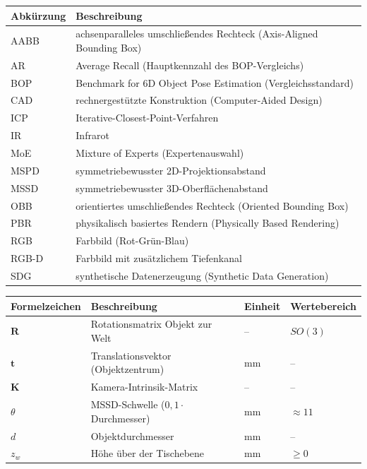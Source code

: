 \documentclass[oneside,studentpaper]{wbk}
\renewcommand{\vec}[1]{\boldsymbol{#1}}
\begin{document}
\begin{longtable}{p{3cm} p{13cm}}
	\textbf{Abk\"urzung} & \textbf{Beschreibung} \\ \midrule \endhead
	AABB    & achsenparalleles umschlie{\ss}endes Rechteck (Axis-Aligned Bounding Box) \\
	AR      & Average Recall (Hauptkennzahl des BOP-Vergleichs) \\
	BOP     & Benchmark for 6D Object Pose Estimation (Vergleichsstandard) \\
	CAD     & rechnergest\"utzte Konstruktion (Computer-Aided Design) \\
	ICP     & Iterative-Closest-Point-Verfahren \\
	IR      & Infrarot \\
	MoE     & Mixture of Experts (Expertenauswahl) \\
	MSPD    & symmetriebewusster 2D-Projektionsabstand \\
	MSSD    & symmetriebewusster 3D-Oberfl\"achenabstand \\
	OBB     & orientiertes umschlie{\ss}endes Rechteck (Oriented Bounding Box) \\
	PBR     & physikalisch basiertes Rendern (Physically Based Rendering) \\
	RGB     & Farbbild (Rot-Gr\"un-Blau) \\
	RGB-D   & Farbbild mit zus\"atzlichem Tiefenkanal \\
	SDG     & synthetische Datenerzeugung (Synthetic Data Generation) \\
\end{longtable}

\cleardoublepage

\begin{longtable}{l p{} l l}
	\textbf{Formelzeichen} & \textbf{Beschreibung} & \textbf{Einheit} & \textbf{Wertebereich} \\ \midrule \endhead
	$\vec{R}$ & Rotationsmatrix Objekt zur Welt & -- & $SO(3)$ \\
	$\vec{t}$ & Translationsvektor (Objektzentrum) & mm & -- \\
	$\vec{K}$ & Kamera-Intrinsik-Matrix & -- & -- \\
	$\theta$ & MSSD-Schwelle ($0{,}1 \cdot$ Durchmesser) & mm & $\approx 11$ \\
	$d$ & Objektdurchmesser & mm & -- \\
	$z_w$ & H\"ohe \"uber der Tischebene & mm & $\geq 0$ \\
\end{longtable}
\end{document}
